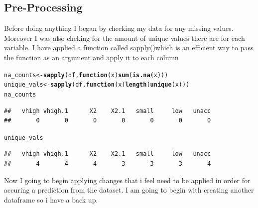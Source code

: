 \documentclass{article}\usepackage[]{graphicx}\usepackage[]{color}
\makeatletter
\newcommand{\hlstd}[1]{\textcolor[rgb]{0.345,0.345,0.345}{#1}}%
\newcommand{\hlkwa}[1]{\textcolor[rgb]{0.161,0.373,0.58}{\textbf{#1}}}%
\newcommand{\hlkwb}[1]{\textcolor[rgb]{0.69,0.353,0.396}{#1}}%
\newcommand{\hlkwc}[1]{\textcolor[rgb]{0.333,0.667,0.333}{#1}}%
\newcommand{\hlkwd}[1]{\textcolor[rgb]{0.737,0.353,0.396}{\textbf{#1}}}%
\newenvironment{kframe}{%
 \def\at@end@of@kframe{}%
 \ifinner\ifhmode%
  \def\at@end@of@kframe{\end{minipage}}%
  \begin{minipage}{\columnwidth}%
 \fi\fi%
 \def\FrameCommand##1{\hskip\@totalleftmargin \hskip-\fboxsep
 \colorbox{shadecolor}{##1}\hskip-\fboxsep
     \hskip-\linewidth \hskip-\@totalleftmargin \hskip\columnwidth}%
 \MakeFramed {\advance\hsize-\width
   \@totalleftmargin\z@ \linewidth\hsize
   \@setminipage}}%
 {\par\unskip\endMakeFramed%
 \at@end@of@kframe}
\newenvironment{knitrout}{}{} %
\makeatother
\begin{document}
\subsection{Pre-Processing}
Before doing anything I began by checking my data for any missing values. Moreover I was also cheking for the amount of unique values there are for each variable. I have applied a function called sapply()which is an efficient way to pass the function as an argument and apply it to
each column
\begin{knitrout}
\color{fgcolor}\begin{kframe}
\begin{alltt}
  \hlstd{na_counts} \hlkwb{<-} \hlkwd{sapply}\hlstd{(df,}\hlkwa{function}\hlstd{(}\hlkwc{x}\hlstd{)} \hlkwd{sum}\hlstd{(}\hlkwd{is.na}\hlstd{(x)))}
  \hlstd{unique_vals}\hlkwb{<-} \hlkwd{sapply}\hlstd{(df,} \hlkwa{function}\hlstd{(}\hlkwc{x}\hlstd{)} \hlkwd{length}\hlstd{(}\hlkwd{unique}\hlstd{(x)))}
  \hlstd{na_counts}
\end{alltt}
\begin{verbatim}
##   vhigh vhigh.1      X2    X2.1   small     low   unacc 
##       0       0       0       0       0       0       0
\end{verbatim}
\begin{alltt}
  \hlstd{unique_vals}
\end{alltt}
\begin{verbatim}
##   vhigh vhigh.1      X2    X2.1   small     low   unacc 
##       4       4       4       3       3       3       4
\end{verbatim}
\end{kframe}
\end{knitrout}
Now I going to begin applying changes that i feel need to be applied in order for accuring a prediction from the dataset. 
I am going to begin with creating another dataframe so i have a back up.
\end{document}
